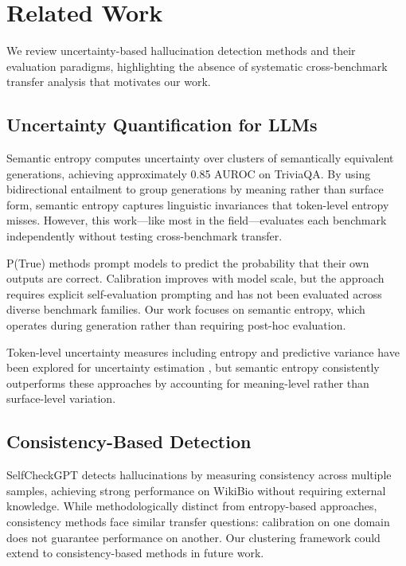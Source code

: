 \section{Related Work}

We review uncertainty-based hallucination detection methods and their evaluation paradigms, highlighting the absence of systematic cross-benchmark transfer analysis that motivates our work.

\subsection{Uncertainty Quantification for LLMs}

Semantic entropy \cite{kuhn2023semantic} computes uncertainty over clusters of semantically equivalent generations, achieving approximately 0.85 AUROC on TriviaQA. By using bidirectional entailment to group generations by meaning rather than surface form, semantic entropy captures linguistic invariances that token-level entropy misses. However, this work---like most in the field---evaluates each benchmark independently without testing cross-benchmark transfer.

P(True) methods \cite{kadavath2022language} prompt models to predict the probability that their own outputs are correct. Calibration improves with model scale, but the approach requires explicit self-evaluation prompting and has not been evaluated across diverse benchmark families. Our work focuses on semantic entropy, which operates during generation rather than requiring post-hoc evaluation.

Token-level uncertainty measures including entropy and predictive variance have been explored for uncertainty estimation \cite{xiao2021hallucination}, but semantic entropy consistently outperforms these approaches by accounting for meaning-level rather than surface-level variation.

\subsection{Consistency-Based Detection}

SelfCheckGPT \cite{manakul2023selfcheckgpt} detects hallucinations by measuring consistency across multiple samples, achieving strong performance on WikiBio without requiring external knowledge. While methodologically distinct from entropy-based approaches, consistency methods face similar transfer questions: calibration on one domain does not guarantee performance on another. Our clustering framework could extend to consistency-based methods in future work.

